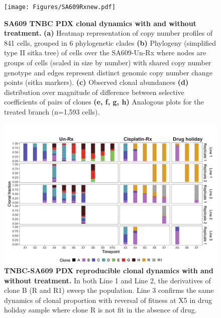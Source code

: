 
\begin{figure}
\centering
\texttt{[image: Figures/SA609Rxnew.pdf]}
	
\caption[SA609 TNBC PDX clonal dynamics with and without treatment.]
	{\small
	\textbf{SA609 TNBC PDX clonal dynamics with and without treatment.}
	    \textbf{(a)} Heatmap representation of copy number profiles of 841 cells, grouped in 6 phylogenetic clades 
	    \textbf{(b)} Phylogeny (simplified type II sitka tree) of cells over the SA609-Un-Rx where nodes are groups of cells (scaled in size by number) with shared copy number genotype and edges represent distinct genomic copy number change points (sitka markers). \textbf{(c)} Observed clonal abundances \textbf{(d)} distribution over magnitude of difference between selective coefficients of pairs of clones \textbf{(e, f, g, h)} Analogous plots for the treated branch (n=1,593 cells).
	}
	\label{fig:SA609Rxnew}
\end{figure}


\begin{figure}
\centering
\includegraphics[width=\textwidth]{Figures/SA609barplotanalysis.pdf}
	
\caption[TNBC-SA609 PDX reproducible clonal dynamics with and without treatment]
	{\small
	\textbf{TNBC-SA609 PDX reproducible clonal dynamics with and without treatment.}
	    In both Line 1 and Line 2, the derivatives of clone B (R and R1) sweep the population. Line 3 confirms the same dynamics of clonal proportion with reversal of fitness at X5 in drug holiday sample where clone R is not fit in the absence of drug.
	}
	\label{fig:SA609barplotanalysis}
\end{figure}

